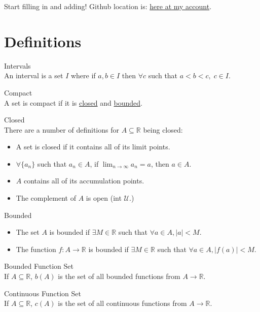 \documentclass{article}
\begin{document}
Start filling in and adding!  Github location is: \href{http://github.com/ottocode/realAnalysis}{here at my account}.

\section{Definitions}
\begin{description}
\item Intervals \label{interval}\hfill \\
	An interval is a set \(I\) where if \(a,b\in I\) then \(\forall c\) such that \(a<b<c,\; c\in I\).

\item Compact \label{compact}\hfill \\
	A set is compact if it is \hyperref[closed]{closed} and \hyperref[bounded]{bounded}.
	
\item Closed \label{closed}\hfill \\
There are a number of definitions for \(A\subseteq \mathbb{R}\) being closed:
\begin{itemize}
\item A set is closed if it contains all of its limit points.
\item \(\forall \{a_n\} \) such that \(a_n \in A\), if \(\lim_{n\to\infty}a_n=a\), then \(a\in A.\)
\item \(A\) contains all of its accumulation points.
\item The complement of \(A\) is open (int \(\mathcal{U}\).)
\end{itemize}

\item Bounded \label{bounded}\hfill \\
\begin{itemize}
\item The set \(A\) is bounded if \(\exists M\in\mathbb{R}\) such that \(\forall a\in A, |a|<M.\)
\item The function \(f:A\to \mathbb{R}\) is bounded if \(\exists M\in\mathbb{R}\) such that \(\forall a\in A, |f(a)|<M.\)
\end{itemize}

\item Bounded Function Set \label{setofboundedfunctions}\hfill \\
If \(A\subseteq\mathbb{R}\), \(b(A)\) is the set of all bounded functions from \(A\to\mathbb{R}\).

\item Continuous Function Set \label{setofcontinuousfunctions}\hfill \\
If \(A\subseteq\mathbb{R}\), \(c(A)\) is the set of all continuous functions from \(A\to\mathbb{R}\).


\end{description}
\end{document}

